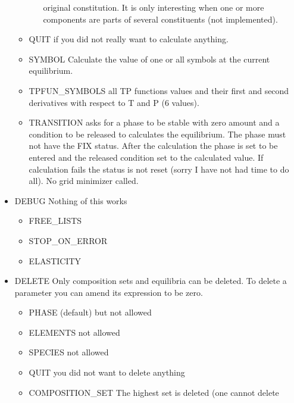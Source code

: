 \documentclass[12pt]{article}
\begin{document}
\begin{itemize}
\begin{itemize}
\begin{itemize}
      original constitution.  It is only interesting when one or more
      components are parts of several constituents (not implemented).
    \end{itemize}
  \item QUIT if you did not really want to calculate anything.
  \item SYMBOL Calculate the value of one or all symbols at the current
    equilibrium.
  \item TPFUN\_SYMBOLS all TP functions values and their first and
    second derivatives with respect to T and P (6 values).
  \item TRANSITION asks for a phase to be stable with zero amount and
    a condition to be released to calculates the equilibrium.  The
    phase must not have the FIX status.  After the calculation the
    phase is set to be entered and the released condition set to the
    calculated value.  If calculation fails the status is not reset
    (sorry I have not had time to do all).  No grid minimizer called.
  \end{itemize}
\item DEBUG           Nothing of this works
  \begin{itemize}
  \item FREE\_LISTS      
  \item STOP\_ON\_ERROR   
  \item ELASTICITY 
  \end{itemize}
\item DELETE Only composition sets and equilibria can be deleted.  To
  delete a parameter you can amend its expression to be zero.
  \begin{itemize}
  \item PHASE (default) but not allowed
  \item ELEMENTS        not allowed
  \item SPECIES         not allowed
  \item QUIT            you did not want to delete anything
  \item COMPOSITION\_SET The highest set is deleted (one cannot delete

\end{itemize}
\end{itemize}
\end{document}

